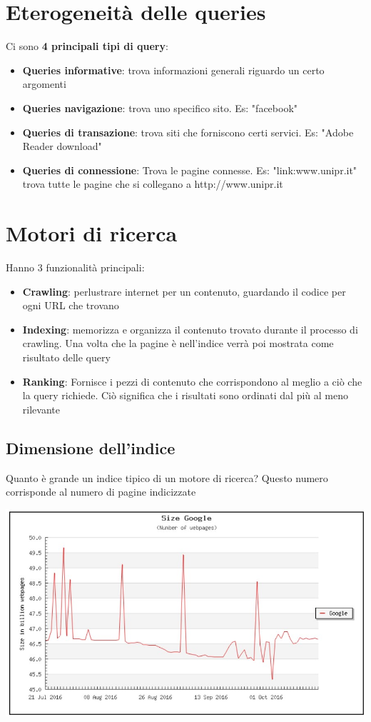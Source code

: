 \section{Eterogeneità delle queries}
Ci sono \textbf{4 principali tipi di query}:
\begin{itemize}
    \item \textbf{Queries informative}: trova informazioni generali riguardo un certo argomenti
    \item \textbf{Queries navigazione}: trova uno specifico sito. Es: "facebook"
    \item \textbf{Queries di transazione}: trova siti che forniscono certi servici. Es: "Adobe Reader download"
    \item \textbf{Queries di connessione}: Trova le pagine connesse. Es: "link:www.unipr.it" trova tutte le pagine che si collegano a http://www.unipr.it
\end{itemize}

\section{Motori di ricerca}
Hanno 3 funzionalità principali:
\begin{itemize}
    \item \textbf{Crawling}: perlustrare internet per un contenuto, guardando il codice per ogni URL che trovano
    \item \textbf{Indexing}: memorizza e organizza il contenuto trovato durante il processo di crawling. Una volta che la pagine è nell'indice verrà poi mostrata come risultato delle query
    \item \textbf{Ranking}: Fornisce i pezzi di contenuto che corrispondono al meglio a ciò che la query richiede. Ciò significa che i risultati sono ordinati dal più al meno rilevante
\end{itemize}

\subsection{Dimensione dell'indice}
Quanto è grande un indice tipico di un motore di ricerca? Questo numero corrisponde al numero di pagine indicizzate

\begin{center}
    \includegraphics[scale=0.4]{Images/TecnologieWeb/7/IndexSize.jpg}
\end{center}

